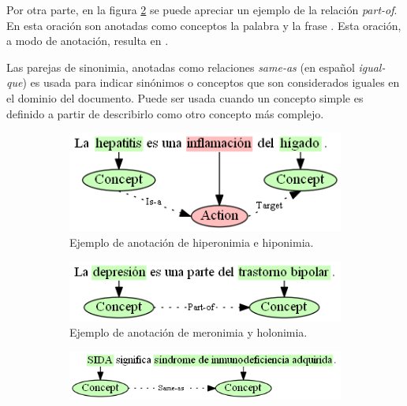 Por otra parte, en la figura \ref{fig:annotation_example_part_of} se puede apreciar un ejemplo de la relación \textit{part-of}. En esta oración son anotadas como conceptos la palabra  y la frase . Esta oración, a modo de anotación, resulta en .

Las parejas de sinonimia, anotadas como relaciones \textit{same-as} (en español \textit{igual-que}) es usada para indicar sinónimos o conceptos que son considerados iguales en el dominio del documento. Puede ser usada cuando un concepto simple es definido a partir de describirlo como otro concepto más complejo.

\begin{figure}[H]
	\centering
	\begin{subfigure}{3.1in}
		\includegraphics[width=\textwidth]{graphics/annotation_example_is_a.png}
		\caption{Ejemplo de anotación de hiperonimia e hiponimia.}
		\vspace{0.4in}
		\label{fig:annotation_example_is_a}
	\end{subfigure}
	\begin{subfigure}{3.25in}
		\includegraphics[width=\linewidth]{graphics/annotation_example_part_of.png}
		\caption{Ejemplo de anotación de meronimia y holonimia.}
		\vspace{0.4in}
		\label{fig:annotation_example_part_of}
	\end{subfigure}
	\begin{subfigure}{4.2in}
		\includegraphics[width=\linewidth]{graphics/annotation_example_same_as.png}

\end{subfigure}
\end{figure}
